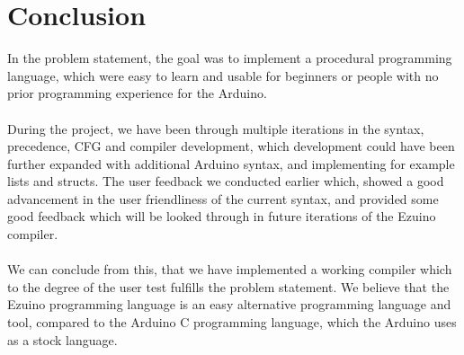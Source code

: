 \chapter{Conclusion}\label{ch:conclusion}
In the problem statement, the goal was to implement a procedural programming language, which were easy to learn and usable for beginners or people with no prior programming experience for the Arduino. \\
\\
During the project, we have been through multiple iterations in the syntax, precedence, CFG and compiler development, which development could have been further expanded with additional Arduino syntax, and implementing for example lists and structs. The user feedback we conducted earlier which, showed a good advancement in the user friendliness of the current syntax, and provided some good feedback which will be looked through in future iterations of the Ezuino compiler.\\
\\
We can conclude from this, that we have implemented a working compiler which to the degree of the user test fulfills the problem statement. We believe that the Ezuino programming language is an easy alternative programming language and tool, compared to the Arduino C programming language, which the Arduino uses as a stock language.